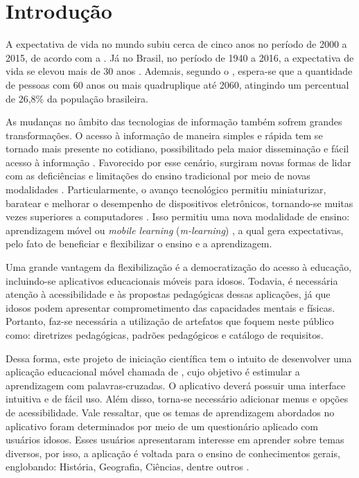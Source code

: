 \chapter{Introdução}
\label{sec:introd}
A expectativa de vida no mundo subiu cerca de cinco anos no período de 2000 a 2015, de acordo com a \cite{world2016world}. Já no Brasil, no período de 1940 a 2016, a expectativa de vida se elevou mais de 30 anos \citep{expectativabrasileiros}. Ademais, segundo o \cite{demografico2010disponivel}, espera-se que a quantidade de pessoas com 60 anos ou mais quadruplique até 2060, atingindo um percentual de 26,8\% da população brasileira.

As mudanças no âmbito das tecnologias de informação também sofrem grandes transformações. O acesso à informação de maneira simples e rápida tem se tornado mais presente no cotidiano, possibilitado pela maior disseminação e fácil acesso à informação \citep{Grossi2014}. Favorecido por esse cenário, surgiram novas formas de lidar com as deficiências e limitações do ensino tradicional por meio de novas modalidades \citep{Behrens2005}. Particularmente, o avanço tecnológico permitiu miniaturizar, baratear e melhorar o desempenho de dispositivos eletrônicos, tornando-se muitas vezes superiores a computadores \citep{Zamfirache2013}. Isso permitiu uma nova modalidade de ensino: aprendizagem móvel ou \textit{mobile learning} (\textit{m-learning}) \citep{Crompton2013, Keegan2005, Traxler2006, Wu2012}, a qual gera expectativas, pelo fato de beneficiar e flexibilizar o ensino e a aprendizagem.

Uma grande vantagem da flexibilização é a democratização do acesso à educação, incluindo-se aplicativos educacionais móveis para idosos. Todavia, é necessária atenção à acessibilidade e às propostas pedagógicas dessas aplicações, já que idosos podem apresentar comprometimento das capacidades mentais e físicas. Portanto, faz-se necessária a utilização de artefatos que foquem neste público como: diretrizes pedagógicas, padrões pedagógicos e catálogo de requisitos.

Dessa forma, este projeto de iniciação científica tem o intuito de desenvolver uma aplicação educacional móvel chamada de \crossword, cujo objetivo é estimular a aprendizagem com palavras-cruzadas. O aplicativo deverá possuir uma interface intuitiva e de fácil uso. Além disso, torna-se necessário adicionar menus e opções de acessibilidade. Vale ressaltar, que os temas de aprendizagem abordados no aplicativo foram determinados por meio de um questionário aplicado com usuários idosos. Esses usuários apresentaram interesse em aprender sobre temas diversos, por isso, a aplicação é voltada para o ensino de conhecimentos gerais, englobando: História, Geografia, Ciências, dentre outros \citep{oliveira2018crossword}. 

